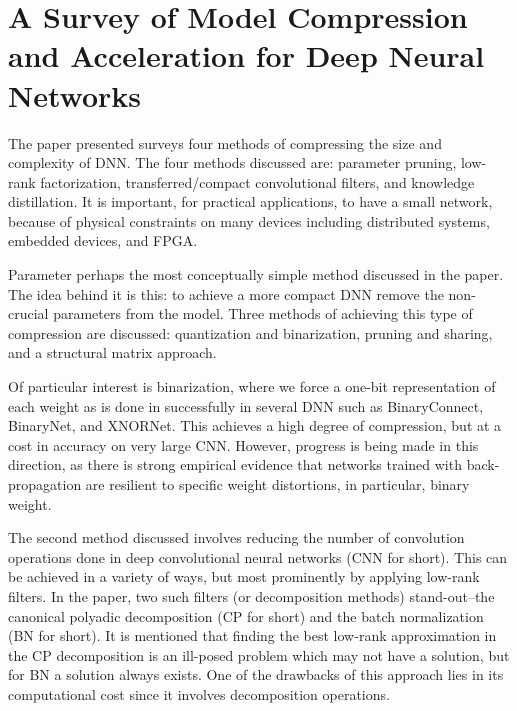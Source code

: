 \section{A Survey of Model Compression and Acceleration for Deep Neural Networks}

The paper presented surveys four methods of compressing the size and complexity
of DNN. The four methods discussed are: parameter pruning, low-rank
factorization, transferred/compact convolutional filters, and knowledge
distillation. It is important, for practical applications, to have a small
network, because of physical constraints on many devices including distributed
systems, embedded devices, and FPGA.

Parameter perhaps the most conceptually simple method discussed in the paper.
The idea behind it is this: to achieve a more compact DNN remove the non-crucial
parameters from the model. Three methods of achieving this type of compression
are discussed: quantization and binarization, pruning and sharing, and a
structural matrix approach. 

Of particular interest is binarization, where we force a one-bit representation
of each weight as is done in successfully in several DNN such as BinaryConnect,
BinaryNet, and XNORNet. This achieves a high degree of compression, but at a
cost in accuracy on very large CNN. However, progress is being made in this
direction, as there is strong empirical evidence that networks trained with
back-propagation are resilient to specific weight distortions, in particular,
binary weight.

The second method discussed involves reducing the number of convolution
operations done in deep convolutional neural networks (CNN for short). This can
be achieved in a variety of ways, but most prominently by applying low-rank
filters. In the paper, two such filters (or decomposition methods)
stand-out--the canonical polyadic decomposition (CP for short) and the batch
normalization (BN for short). It is mentioned that finding the best low-rank
approximation in the CP decomposition is an ill-posed problem which may not have
a solution, but for BN a solution always exists. One of the drawbacks of this
approach lies in its computational cost since it involves decomposition
operations.

